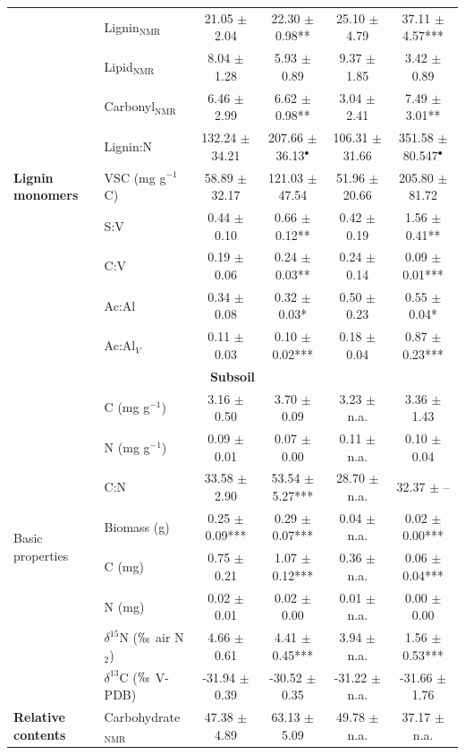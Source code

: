 \begin{table}[htbp]
\begin{tabular}{llcccc}
  & Lignin$_{\text{NMR}}$ & 21.05 $\pm$ 2.04 & 22.30 $\pm$ 0.98** & 25.10 $\pm$ 4.79 & 37.11 $\pm$ 4.57*** \\
  & Lipid$_{\text{NMR}}$ & 8.04 $\pm$ 1.28 & 5.93 $\pm$ 0.89 & 9.37 $\pm$ 1.85 & 3.42 $\pm$ 0.89 \\
  & Carbonyl$_{\text{NMR}}$ & 6.46 $\pm$ 2.99 & 6.62 $\pm$ 0.98** & 3.04 $\pm$ 2.41 & 7.49 $\pm$ 3.01** \\
  & Lignin:N & 132.24 $\pm$ 34.21 & 207.66 $\pm$ 36.13$^{\bullet}$ & 106.31 $\pm$ 31.66 & 351.58 $\pm$ 80.547$^{\bullet}$ \\
  \midrule
  \textbf{Lignin monomers} & VSC (mg g$^{-1}$ C) & 58.89 $\pm$ 32.17 & 121.03 $\pm$ 47.54 & 51.96 $\pm$ 20.66 & 205.80 $\pm$ 81.72 \\
  & S:V & 0.44 $\pm$ 0.10 & 0.66 $\pm$ 0.12** & 0.42 $\pm$ 0.19 & 1.56 $\pm$ 0.41** \\
  & C:V & 0.19 $\pm$ 0.06 & 0.24 $\pm$ 0.03** & 0.24 $\pm$ 0.14 & 0.09 $\pm$ 0.01*** \\
  & Ac:Al & 0.34 $\pm$ 0.08 & 0.32 $\pm$ 0.03* & 0.50 $\pm$ 0.23 & 0.55 $\pm$ 0.04* \\
  & Ac:Al$_V$ & 0.11 $\pm$ 0.03 & 0.10 $\pm$ 0.02*** & 0.18 $\pm$ 0.04 & 0.87 $\pm$ 0.23*** \\
  \midrule
  \multicolumn{6}{c}{\textbf{Subsoil}} \\
  \midrule
  \multirow{8}{*}{Basic properties} & C (mg g$^{-1}$) & 3.16 $\pm$ 0.50 & 3.70 $\pm$ 0.09 & 3.23 $\pm$ n.a. & 3.36 $\pm$ 1.43 \\
  & N (mg g$^{-1}$) & 0.09 $\pm$ 0.01 & 0.07 $\pm$ 0.00 & 0.11 $\pm$ n.a. & 0.10 $\pm$ 0.04 \\
  & C:N & 33.58 $\pm$ 2.90 & 53.54 $\pm$ 5.27*** & 28.70 $\pm$ n.a. & 32.37 $\pm$ -- \\
  & Biomass (g) & 0.25 $\pm$ 0.09*** & 0.29 $\pm$ 0.07*** & 0.04 $\pm$ n.a. & 0.02 $\pm$ 0.00*** \\
  & C (mg) & 0.75 $\pm$ 0.21 & 1.07 $\pm$ 0.12*** & 0.36 $\pm$ n.a. & 0.06 $\pm$ 0.04*** \\
  & N (mg) & 0.02 $\pm$ 0.01 & 0.02 $\pm$ 0.00 & 0.01 $\pm$ n.a. & 0.00 $\pm$ 0.00 \\
  & $\delta^{15}$N ($\permil$ air N$_2$) & 4.66 $\pm$ 0.61 & 4.41 $\pm$ 0.45*** & 3.94 $\pm$ n.a. & 1.56 $\pm$ 0.53*** \\
  & $\delta^{13}$C ($\permil$ V-PDB) & -31.94 $\pm$ 0.39 & -30.52 $\pm$ 0.35 & -31.22 $\pm$ n.a. & -31.66 $\pm$ 1.76 \\
  \midrule
  \textbf{Relative contents} & Carbohydrate$_{\text{NMR}}$ & 47.38 $\pm$ 4.89 & 63.13 $\pm$ 5.09 & 49.78 $\pm$ n.a. & 37.17 $\pm$ n.a. \\

\end{tabular}
\end{table}
